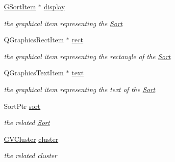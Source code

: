\begin{DoxyCompactItemize}
\item 
\hypertarget{class_g_sort_a3dd9dc7aefa88ffa6a94fa0412434ec5}{\hyperlink{class_g_sort_item}{\-G\-Sort\-Item} $\ast$ \hyperlink{class_g_sort_a3dd9dc7aefa88ffa6a94fa0412434ec5}{display}}\label{class_g_sort_a3dd9dc7aefa88ffa6a94fa0412434ec5}

\begin{DoxyCompactList}\small\item\em the graphical item representing the \hyperlink{class_sort}{\-Sort} \end{DoxyCompactList}\item 
\hypertarget{class_g_sort_ae9555111be5199a489eda07da4f9963f}{\-Q\-Graphics\-Rect\-Item $\ast$ \hyperlink{class_g_sort_ae9555111be5199a489eda07da4f9963f}{rect}}\label{class_g_sort_ae9555111be5199a489eda07da4f9963f}

\begin{DoxyCompactList}\small\item\em the graphical item representing the rectangle of the \hyperlink{class_sort}{\-Sort} \end{DoxyCompactList}\item 
\hypertarget{class_g_sort_a17c4f8eafc9402f5393e69e614f5429a}{\-Q\-Graphics\-Text\-Item $\ast$ \hyperlink{class_g_sort_a17c4f8eafc9402f5393e69e614f5429a}{text}}\label{class_g_sort_a17c4f8eafc9402f5393e69e614f5429a}

\begin{DoxyCompactList}\small\item\em the graphical item representing the text of the \hyperlink{class_sort}{\-Sort} \end{DoxyCompactList}\item 
\hypertarget{class_g_sort_a8dea499c0b3fa30f9e9558a165a52030}{\-Sort\-Ptr \hyperlink{class_g_sort_a8dea499c0b3fa30f9e9558a165a52030}{sort}}\label{class_g_sort_a8dea499c0b3fa30f9e9558a165a52030}

\begin{DoxyCompactList}\small\item\em the related \hyperlink{class_sort}{\-Sort} \end{DoxyCompactList}\item 
\hypertarget{class_g_sort_aed2a99e461d0af9b2b323e1a9fda92fa}{\hyperlink{struct_g_v_cluster}{\-G\-V\-Cluster} \hyperlink{class_g_sort_aed2a99e461d0af9b2b323e1a9fda92fa}{cluster}}\label{class_g_sort_aed2a99e461d0af9b2b323e1a9fda92fa}

\begin{DoxyCompactList}\small\item\em the related cluster \end{DoxyCompactList}\end{DoxyCompactItemize}
